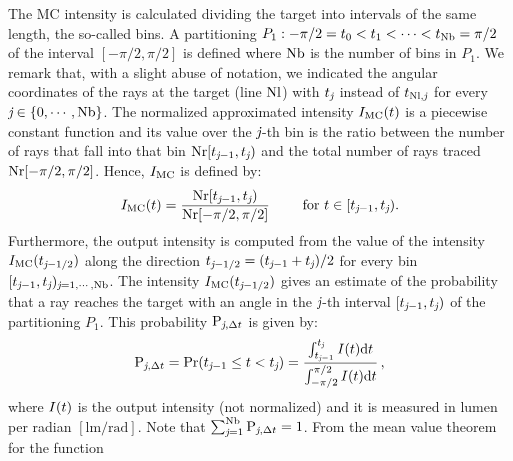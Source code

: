 The MC intensity is calculated dividing the target into intervals of the same length, the so-called bins. A partitioning
$P_1: -\pi/2 = t_{0}<t_{1}<\cdots <t_{\textrm{Nb}}=\pi/2$ of the interval $[-\pi/2, \pi/2]$ is defined where $\textrm{Nb}$ is the number of bins in $P_1$.
We remark that, with a slight abuse of notation, we indicated the angular coordinates of the rays at the target (line $\textrm{Nl}$) with $t_{\textit{j}}$ instead of $t_{\textrm{Nl},\textit{j}}$ for every $\textit{j}\in\{0, \cdots, \textrm{Nb}\}$.
The normalized approximated intensity $I_{\textrm{MC}}(t)$ is a piecewise constant function and its value over the $\textit{j}$-th bin is the ratio between the number of rays that fall into that bin
$\textrm{Nr}[t_{\textit{j}-1},t_{\textit{j}})$ and the total number of rays traced $\textrm{Nr}[-\pi/2, \pi/2]$.
Hence, $I_{\textrm{MC}}$ is defined by:
\begin{equation} \label{g_mc}
I_{\textrm{MC}}(t) = \frac{\textrm{Nr}[t_{\textit{j}-1},t_{\textit{j}})}{\textrm{Nr}[-\pi/2, \pi/2]} \qquad \mbox{ for } t\in[t_{\textit{j}-1}, t_{\textit{j}}).
\end{equation}
Furthermore, the output intensity is computed from the value of the intensity $I_{\textrm{MC}}(t_{\textit{j}-1/2})$ along the direction $t_{\textit{j}-1/2}=(t_{\textit{j}-1}+
t_{\textit{j}})/2$ for every bin $[t_{\textit{j}-1},t_{\textit{j}})_{\textit{j} = 1, \cdots, \textrm{Nb}}$.
 The intensity $I_{\textrm{MC}}(t_{\textit{j}-1/2})$ gives an estimate of the probability that a ray reaches the target with an angle in the $\textit{j}$-th interval
$[t_{\textit{j}-1}, t_{\textit{j}})$ of the partitioning $P_1$. This probability $\textrm{P}_{\textit{j}, \Delta t}$ is given by:
\begin{equation}\label{eq:probability}
\textrm{P}_{\textit{j}, \Delta t} = \Pr(t_{\textit{j}-1}\leq t<t_{\textit{j}})=
\frac{\int_{t_{\textit{j}-1}}^{t_{\textit{j}}} I(t) \textrm{d}t}{\int_{-\pi/2}^{\pi/2}I(t) \textrm{d}t}\,,
\end{equation}
where $I(t)$ is the output intensity (not normalized) and it is measured in lumen per radian $[\textrm{lm}/\textrm{rad}]$.
Note that $\sum_{\textit{j}=1}^{\textrm{Nb}}\textrm{P}_{\textit{j}, \Delta t}=1$. From the mean value theorem for the function
